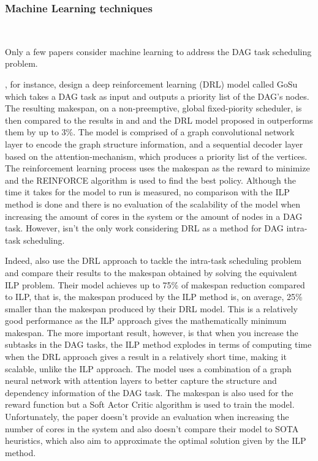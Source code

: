 \subsubsection{Machine Learning techniques}
~

Only a few papers consider machine learning 
to address the DAG task scheduling problem.

\citet{Lee2021GlobalDagSchedDRL}, for instance,
design a deep reinforcement learning (DRL) model called GoSu 
which takes a DAG task as input and outputs 
a priority list of the DAG's nodes.
The resulting makespan, on a non-preemptive, global fixed-piority scheduler, is 
then compared to the results in \cite{Zhao2022DAGsched} and \cite{He2019DagIntra}
and the DRL model proposed in \cite{Lee2021GlobalDagSchedDRL}
outperforms them by up to 3\%.
The model is comprised of a graph convolutional network 
layer to encode the graph structure information,
and a sequential decoder layer based on the attention-mechanism,
which produces a priority list of the vertices.
The reinforcement learning process uses the makespan as the reward to minimize
and the REINFORCE algorithm is used to find the best policy.
Although the time it takes for the model to run is measured,
no comparison with the ILP method is done and 
there is no evaluation of the scalability of the model 
when increasing the amount of cores in the system or the amount of nodes in a DAG task.
However, \citet{Lee2021GlobalDagSchedDRL} isn't the only work considering 
DRL as a method for DAG intra-task scheduling.

Indeed, \citet{Zhao2024GATDRLmodel} also 
use the DRL approach to tackle the intra-task scheduling 
problem and compare their results to the makespan
obtained by solving the equivalent ILP problem.
Their model achieves up to 75\% of makespan 
reduction compared to ILP, that is, the makespan 
produced by the ILP method is, on average, 25\% smaller than the 
makespan produced by their DRL model.
This is a relatively good performance as 
the ILP approach gives the mathematically minimum makespan.
The more important result, however,
is that when you increase the subtasks in the DAG tasks,
the ILP method explodes in terms of computing
time when the DRL approach gives a result in a relatively short time,
making it scalable, unlike the ILP approach.
The model uses a combination of a graph neural network 
with attention layers to better capture 
the structure and dependency information of the DAG task.
The makespan is also used for the reward function but 
a Soft Actor Critic algorithm is used to train the model. 
Unfortunately, the paper doesn't provide 
an evaluation when increasing the number of cores 
in the system and also doesn't compare their model 
to SOTA heuristics, which also aim to approximate 
the optimal solution given by the ILP method.

